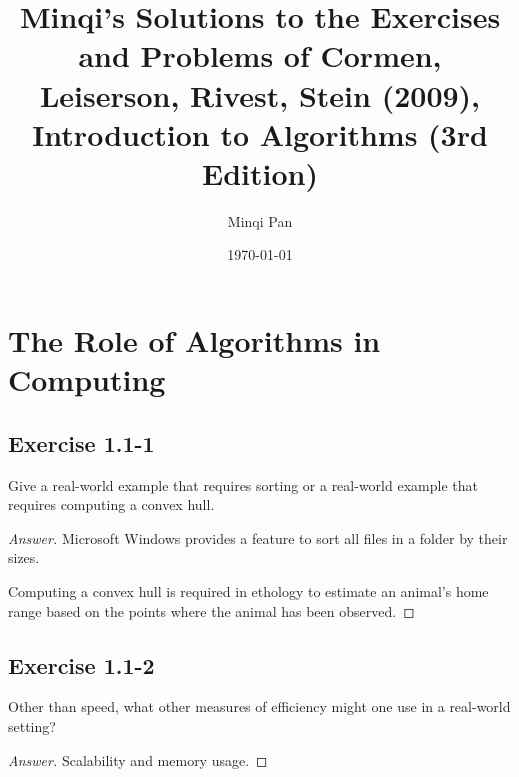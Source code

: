 \documentclass{amsbook}
\theoremstyle{definition}
\theoremstyle{remark}
\numberwithin{section}{chapter}
\numberwithin{equation}{chapter}
\begin{document}
\frontmatter
\title{Minqi's Solutions to the Exercises and Problems of Cormen, Leiserson, Rivest, Stein (2009), Introduction to Algorithms (3rd Edition)}

\author{Minqi Pan}

\date{\today}

\maketitle

\setcounter{page}{4}

\tableofcontents

\mainmatter

\chapter{The Role of Algorithms in Computing}

\section{Exercise 1.1-1}
Give a real-world example that requires sorting or a real-world example that requires computing a convex hull.
\begin{proof}[Answer]
Microsoft Windows provides a feature to sort all files in a folder by their sizes.

Computing a convex hull is required in ethology to estimate an animal's home range based on the points where the animal has been observed.
\end{proof}

\section{Exercise 1.1-2}
Other than speed, what other measures of efficiency might one use in a real-world setting?
\begin{proof}[Answer]
Scalability and memory usage.
\end{proof}
\end{document}
